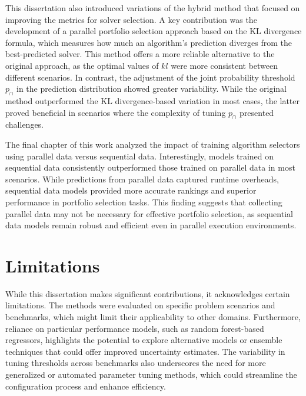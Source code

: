 This dissertation also introduced variations of the hybrid method that focused on improving the metrics for solver selection. A key contribution was the development of a parallel portfolio selection approach based on the KL divergence formula, which measures how much an algorithm's prediction diverges from the best-predicted solver. This method offers a more reliable alternative to the original approach, as the optimal values of $kl$ were more consistent between different scenarios. In contrast, the adjustment of the joint probability threshold $p_{\cap}$ in the prediction distribution showed greater variability. While the original method outperformed the KL divergence-based variation in most cases, the latter proved beneficial in scenarios where the complexity of tuning $p_{\cap}$ presented challenges.

The final chapter of this work analyzed the impact of training algorithm selectors using parallel data versus sequential data. Interestingly, models trained on sequential data consistently outperformed those trained on parallel data in most scenarios. While predictions from parallel data captured runtime overheads, sequential data models provided more accurate rankings and superior performance in portfolio selection tasks. This finding suggests that collecting parallel data may not be necessary for effective portfolio selection, as sequential data models remain robust and efficient even in parallel execution environments.

\section{Limitations}

While this dissertation makes significant contributions, it acknowledges certain limitations. The methods were evaluated on specific problem scenarios and benchmarks, which might limit their applicability to other domains. Furthermore, reliance on particular performance models, such as random forest-based regressors, highlights the potential to explore alternative models or ensemble techniques that could offer improved uncertainty estimates. The variability in tuning thresholds across benchmarks also underscores the need for more generalized or automated parameter tuning methods, which could streamline the configuration process and enhance efficiency.

